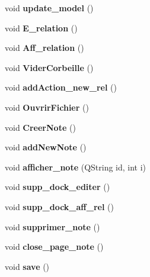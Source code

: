 \begin{DoxyCompactItemize}
\item 
\mbox{\label{classinterface_afb97d08561d883c718da0fd638c7f77f}} 
void {\bfseries update\+\_\+model} ()
\item 
\mbox{\label{classinterface_a0f50f64c70556ffcd16c9073d885e5c3}} 
void {\bfseries E\+\_\+relation} ()
\item 
\mbox{\label{classinterface_a8ac5467a589ab5af2e91056edafa7707}} 
void {\bfseries Aff\+\_\+relation} ()
\item 
\mbox{\label{classinterface_a2e950dd5e3f8937e1147f4f3d696fc40}} 
void {\bfseries Vider\+Corbeille} ()
\item 
\mbox{\label{classinterface_afda8f97b198f7d434cb1eb2d845dfefc}} 
void {\bfseries add\+Action\+\_\+new\+\_\+rel} ()
\item 
\mbox{\label{classinterface_af42d8f6426ad19ce13f1dd2ce9f519c1}} 
void {\bfseries Ouvrir\+Fichier} ()
\item 
\mbox{\label{classinterface_a23957135caad59d8850fe8e2cbee28a3}} 
void {\bfseries Creer\+Note} ()
\item 
\mbox{\label{classinterface_ae2e321a0c7bb4080920c203057d45d82}} 
void {\bfseries add\+New\+Note} ()
\item 
\mbox{\label{classinterface_a320051a7a36aa24f53b12df82649f15f}} 
void {\bfseries afficher\+\_\+note} (Q\+String id, int i)
\item 
\mbox{\label{classinterface_ab53612546e2db13b35dca0df8911413e}} 
void {\bfseries supp\+\_\+dock\+\_\+editer} ()
\item 
\mbox{\label{classinterface_a1a6237ea46e9abd0662b8ec19c556f5e}} 
void {\bfseries supp\+\_\+dock\+\_\+aff\+\_\+rel} ()
\item 
\mbox{\label{classinterface_aff7edfeead207b5e0fbbfc275a13a8ab}} 
void {\bfseries supprimer\+\_\+note} ()
\item 
\mbox{\label{classinterface_abe2464522932a5d8ed76d1ba02c9d2c6}} 
void {\bfseries close\+\_\+page\+\_\+note} ()
\item 
\mbox{\label{classinterface_a319f133949e2be97a203f725c3f1e565}} 
void {\bfseries save} ()
\end{DoxyCompactItemize}
